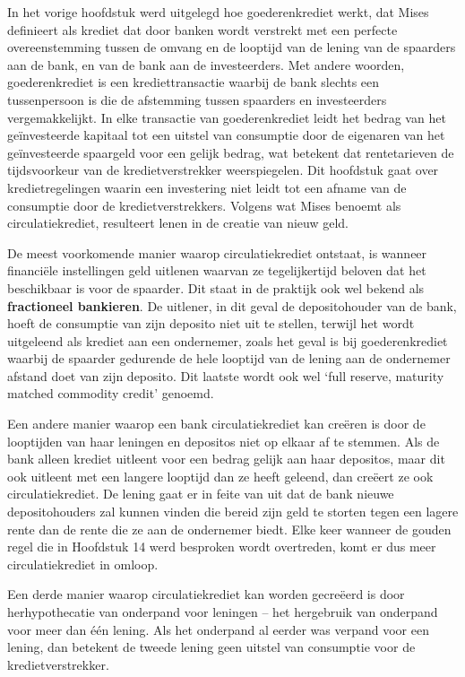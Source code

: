 \documentclass[
  a5paper,
  smalldemyvopaper,11pt,twoside,onecolumn,openright,extrafontsizes,
hidelinks]{memoir}
\begin{document}
In het vorige hoofdstuk werd uitgelegd hoe goederenkrediet werkt, dat
Mises definieert als krediet dat door banken wordt verstrekt met een
perfecte overeenstemming tussen de omvang en de looptijd van de lening
van de spaarders aan de bank, en van de bank aan de investeerders. Met
andere woorden, goederenkrediet is een krediettransactie waarbij de bank
slechts een tussenpersoon is die de afstemming tussen spaarders en
investeerders vergemakkelijkt. In elke transactie van goederenkrediet
leidt het bedrag van het geïnvesteerde kapitaal tot een uitstel van
consumptie door de eigenaren van het geïnvesteerde spaargeld voor een
gelijk bedrag, wat betekent dat rentetarieven de tijdsvoorkeur van de
kredietverstrekker weerspiegelen. Dit hoofdstuk gaat over
kredietregelingen waarin een investering niet leidt tot een afname van
de consumptie door de kredietverstrekkers. Volgens wat Mises benoemt als
circulatiekrediet, resulteert lenen in de creatie van nieuw geld.

De meest voorkomende manier waarop circulatiekrediet ontstaat, is
wanneer financiële instellingen geld uitlenen waarvan ze tegelijkertijd
beloven dat het beschikbaar is voor de spaarder. Dit staat in de
praktijk ook wel bekend als \textbf{fractioneel bankieren}. De uitlener,
in dit geval de depositohouder van de bank, hoeft de consumptie van zijn
deposito niet uit te stellen, terwijl het wordt uitgeleend als krediet
aan een ondernemer, zoals het geval is bij goederenkrediet waarbij de
spaarder gedurende de hele looptijd van de lening aan de ondernemer
afstand doet van zijn deposito. Dit laatste wordt ook wel `full reserve,
maturity matched commodity credit' genoemd.

Een andere manier waarop een bank circulatiekrediet kan creëren is door
de looptijden van haar leningen en depositos niet op elkaar af te
stemmen. Als de bank alleen krediet uitleent voor een bedrag gelijk aan
haar depositos, maar dit ook uitleent met een langere looptijd dan ze
heeft geleend, dan creëert ze ook circulatiekrediet. De lening gaat er
in feite van uit dat de bank nieuwe depositohouders zal kunnen vinden
die bereid zijn geld te storten tegen een lagere rente dan de rente die
ze aan de ondernemer biedt. Elke keer wanneer de gouden regel die in
Hoofdstuk 14 werd besproken wordt overtreden, komt er dus meer
circulatiekrediet in omloop.

Een derde manier waarop circulatiekrediet kan worden gecreëerd is door
herhypothecatie van onderpand voor leningen -- het hergebruik van
onderpand voor meer dan één lening. Als het onderpand al eerder was
verpand voor een lening, dan betekent de tweede lening geen uitstel van
consumptie voor de kredietverstrekker.
\end{document}
